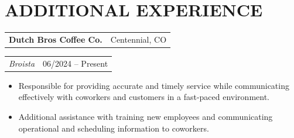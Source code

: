 \documentclass[10pt]{article}
\makeatletter
\newcommand{\companyLine}[2]{
\noindent
\begin{tabular*}{\textwidth}{@{\extracolsep{\fill}} l r}
\textbf{#1} & #2 \\
\end{tabular*}
}
\newcommand{\roleLine}[2]{
\noindent
\begin{tabular*}{\textwidth}{@{\extracolsep{\fill}} l r}
\textit{#1} & #2 \\
\end{tabular*}
}
\makeatother
\begin{document}
\section*{ADDITIONAL EXPERIENCE}

\companyLine{Dutch Bros Coffee Co.}{Centennial, CO}
\roleLine{Broista}{06/2024 -- Present}
\begin{itemize}
\item Responsible for providing accurate and timely service while communicating effectively with coworkers and customers in a fast-paced environment.
\item Additional assistance with training new employees and communicating operational and scheduling information to coworkers.
\end{itemize}
\end{document}
